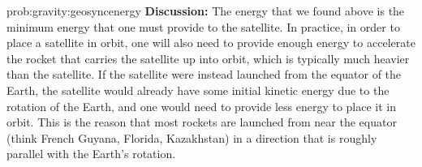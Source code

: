 \begin{solution}{prob:gravity:geosyncenergy}
\textbf{Discussion:} The energy that we found above is the minimum energy that one must provide to the satellite. In practice, in order to place a satellite in orbit, one will also need to provide enough energy to accelerate the rocket that carries the satellite up into orbit, which is typically much heavier than the satellite. If the satellite were instead launched from the equator of the Earth, the satellite would already have some initial kinetic energy due to the rotation of the Earth, and one would need to provide less energy to place it in orbit. This is the reason that most rockets are launched from near the equator (think French Guyana, Florida, Kazakhstan) in a direction that is roughly parallel with the Earth's rotation.
\end{solution}



